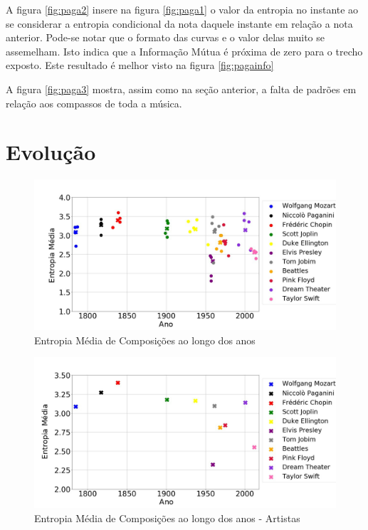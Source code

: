 A figura \ref{fig:paga2} insere na figura \ref{fig:paga1} o valor da entropia no instante ao se considerar a entropia condicional da nota daquele instante em relação a nota anterior. Pode-se notar que o formato das curvas e o valor delas muito se assemelham. Isto indica que a Informação Mútua é próxima de zero para o trecho exposto. Este resultado é melhor visto na figura \ref{fig:pagainfo}

A figura \ref{fig:paga3} mostra, assim como na seção anterior, a falta de padrões em relação aos compassos de toda a música.

\section{Evolução}


\begin{figure}[h]
\centering
\includegraphics[width=\textwidth]{Cap3/evo.jpg}
\caption{Entropia Média de Composições ao longo dos anos}
\label{fig:evo}
\end{figure}

\begin{figure}[h]
\centering
\includegraphics[width=\textwidth]{Cap3/marks2.jpg}
\caption{Entropia Média de Composições ao longo dos anos - Artistas}
\label{fig:artists}
\end{figure}

